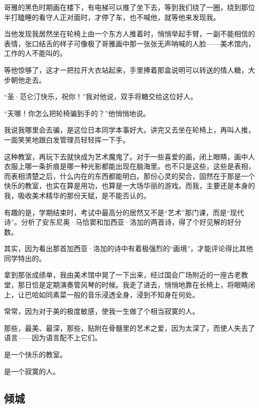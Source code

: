 \par 哥雅的黑色时期画在楼下，有电梯可以推了坐下去，等到我们绕了一圈，绕到那位半打瞌睡的看守人正对面时，才停了车，也不喊他，就等他来发现我。
\par 当他发现我居然坐在轮椅上由一个东方人推着时，悄悄举起手臂，一副不能相信的表情，张口结舌的样子可像极了哥雅画中那一张张无声呐喊的人脸——美术馆内，工作的人不能叫的。
\par 等他惊够了，这才一把拉开大衣站起来，手里捧着那盒说明可以转送的情人糖，大步朝他走去。
\par “圣·范仑汀快乐，祝你！”我对他说，双手将糖交给这位好人。
\par “天哪！你怎么把轮椅骗到手的？”他悄悄地说。
\par 我说我哪里会去骗，是这位日本同学本事好大。讲完又去坐在轮椅上，再叫人推，一面笑笑地跟白发管理员轻轻挥一下手。
\par 这种教室，再玩下去就快成为艺术魔鬼了。对于一些喜爱的画，闭上眼睛，画中人衣服上哪一条折痕是哪一种光影都能出现在脑海里。也不只是这些，这些是表相，而表相清楚之后，什么内在的东西都能明白。那份心灵的契合，固然在于那是一个快乐的教室，也实在算是用功，也算是一大场华丽的游戏。而我，主要还是本身的我，吸收美术精华的那份天赋，是不能否认的。
\par 有趣的是，学期结束时，考试中最高分的居然又不是“艺术”那门课，而是“现代诗”。分析了安东尼奥·马恰窦和加西亚·洛加的两首诗，得了个好见解的好分数。
\par 其实，因为看出那首加西亚·洛加的诗中有着极强烈的“画境”，才能评论得比其他同学特出的。
\par 拿到那张成绩单，我由美术馆中晃了一下出来，经过国会广场附近的一座古老教堂，那日恰是定期演奏管风琴的时候。我走了进去，悄悄地靠在长椅上，将眼睛闭上，让巴哈如同素菜一般的音乐浸透全身，浸到不知身在何处。
\par 常常，因为对于美的极度敏感，使我一生做了个相当寂寞的人。
\par 那些，最美、最深，那些，贴附在骨髓里的艺术之爱，因为太深了，而使人失去了语言——因为语言配不上它们。
\par 是一个快乐的教室。
\par 是一个寂寞的人。



\subsection{倾城}


